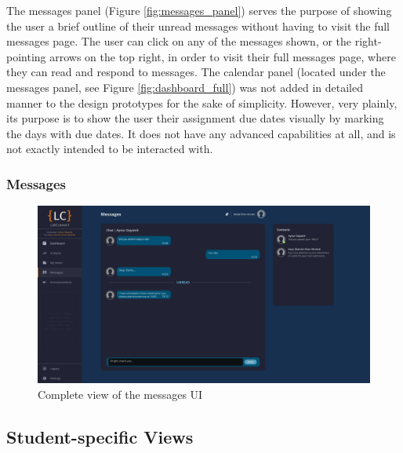 \documentclass[a4paper, 12pt]{article}
\begin{document}
    The messages panel (Figure \ref{fig:messages_panel}) serves the purpose of showing the user a brief outline of their unread messages
    without having to visit the full messages page. The user can click on any of the messages shown, or the right-pointing arrows on the top right,
    in order to visit their full messages page, where they can read and respond to messages.
    The calendar panel (located under the messages panel, see Figure \ref{fig:dashboard_full}) was not added in detailed manner
    to the design prototypes for the sake of simplicity.
    However, very plainly, its purpose is to show the user their assignment due dates visually by marking the days with due dates. 
    It does not have any advanced capabilities at all, and is not exactly intended to be interacted with.
    
    \pagebreak
    
    \subsubsection{Messages}
    
    \begin{figure}[H]
        \centering
        \includegraphics[width=\textwidth]{messages}
        \caption{Complete view of the messages UI}
        \label{fig:messages_full}
    \end{figure}
    
    
    
    
    
    
    
    
    \pagebreak
    
    
    \subsection{Student-specific Views}
    
\end{document}
